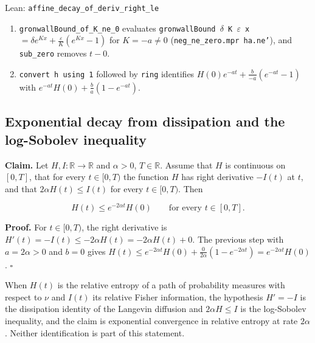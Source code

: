 \documentclass[11pt,a4paper]{report}
\begin{document}
\begin{leanbox}{Lean: \texttt{affine\_\allowbreak{}decay\_\allowbreak{}of\_\allowbreak{}deriv\_\allowbreak{}right\_\allowbreak{}le}}
\begin{enumerate}
\item \texttt{gronwall\allowbreak{}Bound\_\allowbreak{}of\_\allowbreak{}K\_\allowbreak{}ne\_\allowbreak{}0} evaluates \texttt{gronwall\allowbreak{}Bound \ensuremath{\delta} K \ensuremath{\varepsilon} x} \(=\delta e^{Kx}+\frac{\varepsilon}{K}(e^{Kx}-1)\) for \(K=-a\neq0\) (\texttt{neg\_\allowbreak{}ne\_\allowbreak{}zero.\allowbreak{}mpr ha.\allowbreak{}ne'}), and \texttt{sub\_\allowbreak{}zero} removes \(t-0\).

\item \texttt{convert h using 1} followed by \texttt{ring} identifies \(H(0)e^{-at}+\frac{b}{-a}(e^{-at}-1)\) with \(e^{-at}H(0)+\frac ba(1-e^{-at})\).

\end{enumerate}
\end{leanbox}
\subsection{\texorpdfstring{Exponential decay from dissipation and the log-Sobolev inequality}{Exponential decay from dissipation and the log-Sobolev inequality}}
\label{report-step-UnadjustedLangevin-LSI-EntropyDecay-lean-2}


\textbf{Claim.} Let \(H,I:\mathbb R\to\mathbb R\) and \(\alpha>0\), \(T\in\mathbb R\). Assume that \(H\) is continuous on \([0,T]\), that for every \(t\in[0,T)\) the function \(H\) has right derivative \(-I(t)\) at \(t\), and that \(2\alpha H(t)\le I(t)\) for every \(t\in[0,T)\). Then


\[H(t)\le e^{-2\alpha t}H(0)\qquad\text{for every }t\in[0,T].\]


\textbf{Proof.} For \(t\in[0,T)\), the right derivative is \(H'(t)=-I(t)\le-2\alpha H(t)=-2\alpha H(t)+0\). The previous step with \(a=2\alpha>0\) and \(b=0\) gives \(H(t)\le e^{-2\alpha t}H(0)+\frac0{2\alpha}(1-e^{-2\alpha t})=e^{-2\alpha t}H(0)\). \(\square\)




When \(H(t)\) is the relative entropy of a path of probability measures with respect to \(\nu\) and \(I(t)\) its relative Fisher information, the hypothesis \(H'=-I\) is the dissipation identity of the Langevin diffusion and \(2\alpha H\le I\) is the log-Sobolev inequality, and the claim is exponential convergence in relative entropy at rate \(2\alpha\). Neither identification is part of this statement.
\end{document}

